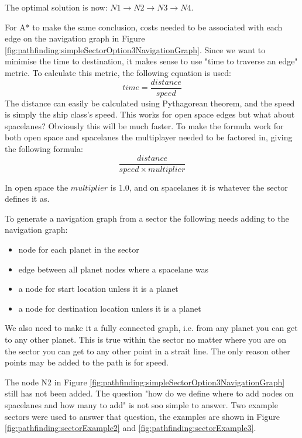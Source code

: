 The optimal solution is now: $N1 \to N2 \to N3 \to N4$.

For A* to make the same conclusion, costs needed to be associated with each edge on the navigation graph in Figure \ref{fig:pathfinding:simpleSectorOption3NavigationGraph}.
Since we want to minimise the time to destination, it makes sense to use "time to traverse an edge" metric.
To calculate this metric, the following equation is used:
$$ time = \frac{distance}{speed} $$
The distance can easily be calculated using Pythagorean theorem, and the speed is simply the ship class's speed.
This works for open space edges but what about spacelanes? Obviously this will be much faster.
To make the formula work for both open space and spacelanes the multiplayer needed to be factored in, giving the following formula:
\begin{equation} \label{eq:pathfinding:cost}
\frac{distance}{speed \times multiplier}
\end{equation}

In open space the $multiplier$ is 1.0, and on spacelanes it is whatever the sector defines it as.

To generate a navigation graph from a sector the following needs adding to the navigation graph:
\begin{itemize}
\item node for each planet in the sector
\item edge between all planet nodes where a spacelane was
\item a node for start location unless it is a planet
\item a node for destination location unless it is a planet
\end{itemize}

We also need to make it a fully connected graph, i.e. from any planet you can get to any other planet.
This is true within the sector no matter where you are on the sector you can get to any other point in a strait line. 
The only reason other points may be added to the path is for speed.

The node N2 in Figure \ref{fig:pathfinding:simpleSectorOption3NavigationGraph} still has not been added.
The question "how do we define where to add nodes on spacelanes and how many to add" is not soo simple to answer.
Two example sectors were used to answer that question, the examples are shown in Figure \ref{fig:pathfinding:sectorExample2} and \ref{fig:pathfinding:sectorExample3}.

